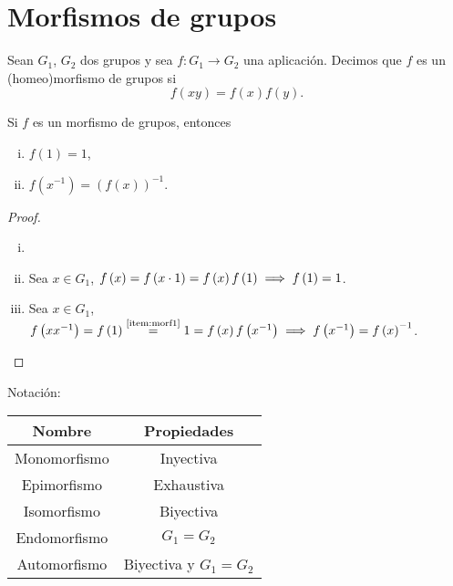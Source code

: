 \section{Morfismos de grupos}

\begin{defi}
    Sean $G_1$, $G_2$ dos grupos y sea $f \colon G_1 \to G_2$ una aplicación. Decimos que $f$ es un
    (homeo)morfismo de grupos si
    \[
        f(xy) = f(x)f(y).
    \]
\end{defi}

\begin{prop}
    Si $f$ es un morfismo de grupos, entonces
    \begin{enumerate}[i)]
        \item \label{item:morf1} $f(1) = 1$,
        \item $f\left( x^{-1} \right) = \left( f(x) \right)^{-1}$.
    \end{enumerate}
\end{prop}

\begin{proof}
    \begin{enumerate}[i)]
        \item[]
        \item Sea $x \in G_1$, $f \left( x \right) = f\left( x\cdot 1\right) = f\left(x \right)f\left( 1 \right) \implies f\left( 1 \right) = 1$.
        \item Sea $x \in G_1$, $f \left( xx^{-1} \right) = f\left( 1\right) \stackrel{\text{\ref{item:morf1}}}{=} 1 = f\left(x \right)f\left( x^{-1} \right) \implies f\left( x^{-1} \right) = f\left( x \right)^{-1}$.
    \end{enumerate}
\end{proof}

\begin{obs}
    Notación:
    \begin{center}
        \begin{tabular}{|c|c|}
            \hline
            Nombre & Propiedades \\
            \hline\hline
            Monomorfismo & Inyectiva \\\hline
            Epimorfismo  & Exhaustiva \\\hline
            Isomorfismo  & Biyectiva \\\hline
            Endomorfismo & $G_1 = G_2$ \\\hline
            Automorfismo & Biyectiva y $G_1 = G_2$ \\
            \hline
        \end{tabular}
    \end{center}
\end{obs}

